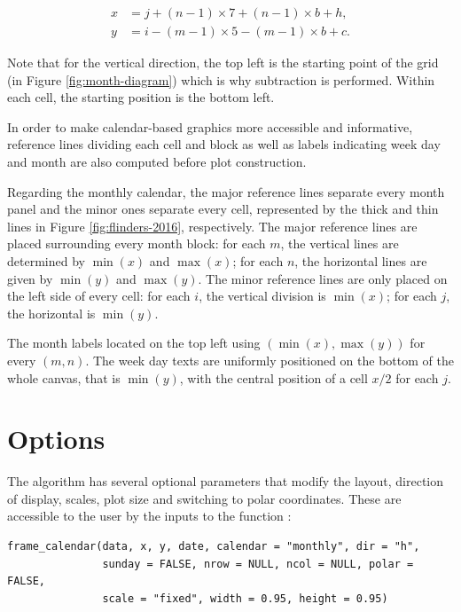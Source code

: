 \begin{equation}
  \begin{aligned}
  x &= j + (n - 1) \times 7 + (n - 1) \times b + h, \\
  y &= i - (m - 1) \times 5 - (m - 1) \times b + c. \label{eq:final}
  \end{aligned}
\end{equation}

Note that for the vertical direction, the top left is the starting point
of the grid (in Figure \ref{fig:month-diagram}) which is why subtraction
is performed. Within each cell, the starting position is the bottom
left.

In order to make calendar-based graphics more accessible and
informative, reference lines dividing each cell and block as well as
labels indicating week day and month are also computed before plot
construction.

Regarding the monthly calendar, the major reference lines separate every
month panel and the minor ones separate every cell, represented by the
thick and thin lines in Figure \ref{fig:flinders-2016}, respectively.
The major reference lines are placed surrounding every month block: for
each \(m\), the vertical lines are determined by \(\min{(x)}\) and
\(\max{(x)}\); for each \(n\), the horizontal lines are given by
\(\min{(y)}\) and \(\max{(y)}\). The minor reference lines are only
placed on the left side of every cell: for each \(i\), the vertical
division is \(\min{(x)}\); for each \(j\), the horizontal is
\(\min{(y)}\).

The month labels located on the top left using
\((\min{(x)}, \max{(y)})\) for every \((m, n)\). The week day texts are
uniformly positioned on the bottom of the whole canvas, that is
\(\min{(y)}\), with the central position of a cell \(x / 2\) for each
\(j\).

\hypertarget{options}{%
\section{Options}\label{options}}

\label{sec:opt}

The algorithm has several optional parameters that modify the layout,
direction of display, scales, plot size and switching to polar
coordinates. These are accessible to the user by the inputs to the
function :

\newpage

\begin{verbatim}
frame_calendar(data, x, y, date, calendar = "monthly", dir = "h", 
               sunday = FALSE, nrow = NULL, ncol = NULL, polar = FALSE, 
               scale = "fixed", width = 0.95, height = 0.95)
\end{verbatim}

